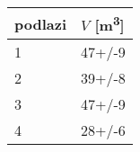 \begin{tabular}{ll}
\toprule
podlazi & $V$ [\si{m^3}] \\
\midrule
1 &         47+/-9 \\
2 &         39+/-8 \\
3 &         47+/-9 \\
4 &         28+/-6 \\
\bottomrule
\end{tabular}
